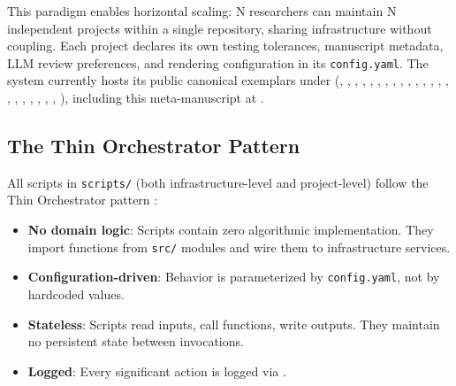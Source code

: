 \documentclass[
  english,
]{article}
\providecommand{\tightlist}{%
  \setlength{\itemsep}{0pt}\setlength{\parskip}{0pt}}
\begin{document}
This paradigm enables horizontal scaling: N researchers can maintain N
independent projects within a single repository, sharing infrastructure
without coupling. Each project declares its own testing tolerances,
manuscript metadata, LLM review preferences, and rendering configuration
in its \texttt{config.yaml}. The system currently hosts its public
canonical exemplars under 
(,
,
,
,
,
,
,
,
,
,
,
,
,
,
,
,
,
,
,
,
,
,
), including this meta-manuscript
at .

\subsection{The Thin Orchestrator
Pattern}\label{the-thin-orchestrator-pattern}

All scripts in \texttt{scripts/} (both infrastructure-level and
project-level) follow the Thin Orchestrator pattern
\citep{gamma1995design}:

\begin{itemize}
\tightlist
\item
  \textbf{No domain logic}: Scripts contain zero algorithmic
  implementation. They import functions from \texttt{src/} modules and
  wire them to infrastructure services.
\item
  \textbf{Configuration-driven}: Behavior is parameterized by
  \texttt{config.yaml}, not by hardcoded values.
\item
  \textbf{Stateless}: Scripts read inputs, call functions, write
  outputs. They maintain no persistent state between invocations.
\item
  \textbf{Logged}: Every significant action is logged via
  .
\end{itemize}
\end{document}
